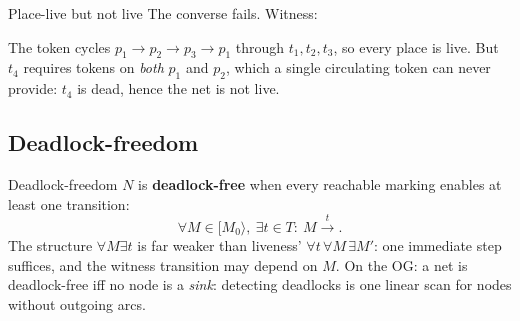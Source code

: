 \begin{examplebox}{Place-live but not live}
The converse fails. Witness:
\begin{center}
\end{center}
The token cycles $p_1 \to p_2 \to p_3 \to p_1$ through $t_1, t_2, t_3$, so every place is live. But $t_4$ requires tokens on \emph{both} $p_1$ and $p_2$, which a single circulating token can never provide: $t_4$ is dead, hence the net is not live.
\end{examplebox}

\subsection{Deadlock-freedom}

\begin{definitionbox}{Deadlock-freedom}
$N$ is \textbf{deadlock-free} when every reachable marking enables at least one transition:
\[
  \forall M \in [M_0\rangle,\ \exists t \in T :\ M \xrightarrow{t}.
\]
The structure $\forall M \exists t$ is far weaker than liveness' $\forall t\, \forall M\, \exists M'$: one immediate step suffices, and the witness transition may depend on $M$. On the OG: a net is deadlock-free iff no node is a \emph{sink}: detecting deadlocks is one linear scan for nodes without outgoing arcs.
\end{definitionbox}

